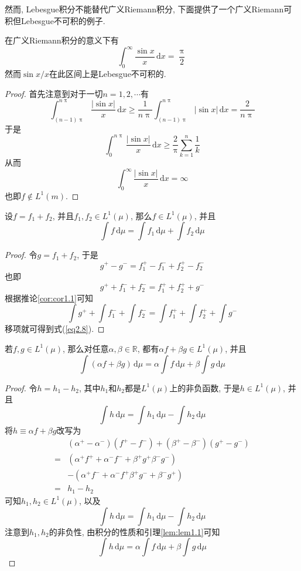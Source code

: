 \documentclass[cn, 12pt, math=mtpro2, bibstyle=apa, blue, twocol]{elegantbook}
\newcommand{\R}{\mathbb{R}}
\newcommand{\du}{\,\text{d}\mu}
\begin{document}
然而, Lebesgue积分不能替代广义Riemann积分, 下面提供了一个广义Riemann可积但Lebesgue不可积的例子.
\begin{example}
在广义Riemann积分的意义下有
$$\int_{0}^{\infty}\frac{\sin x}{x}\,\text{d}x=\frac{\uppi}{2}$$
然而$\sin x/x$在此区间上是Lebesgue不可积的.
\end{example}
\begin{proof}
  首先注意到对于一切$n=1,2,\cdots$有
  $$\int_{(n-1)\uppi}^{n\uppi}\frac{|\sin x|}{x}\,\text{d}x\geq \frac{1}{n\uppi}\int_{(n-1)\uppi}^{n\uppi}|\sin x|\,\text{d}x=\frac{2}{n\uppi}$$
  于是
  $$\int_{0}^{n\uppi}\frac{|\sin x|}{x}\,\text{d}x\geq\frac{2}{\uppi}\sum_{k=1}^{n}\frac{1}{k}$$
  从而
  $$\int_{0}^{\infty}\frac{|\sin x|}{x}\,\text{d}x=\infty$$
  也即$f\notin L^1(m)$.
\end{proof}


\begin{lemma}\label{lem:lem1.1}
设$f=f_1+f_2$, 并且$f_1, f_2\in L^1(\mu)$, 那么$f\in L^1(\mu)$, 并且
\begin{equation}\label{eq2.8}
  \int f\du=\int f_1\du+\int f_2\du
\end{equation}
\end{lemma}
\begin{proof}
  令$g=f_1+f_2$, 于是
  $$g^+-g^-=f_1^+-f_1^-+f_2^+-f_2^-$$
  也即
  $$g^++f_1^-+f_2^-=f_1^++f_2^++g^-$$
  根据推论\ref{cor:cor1.1}可知
  $$\int g^++\int f_1^-+\int f_2^-=\int f_1^++\int f_2^++\int g^-$$
  移项就可得到式(\ref{eq2.8}).
\end{proof}

\begin{theorem}
若$f, g\in L^1(\mu)$, 那么对任意$\alpha, \beta\in\R$, 都有$\alpha f+\beta g\in L^1(\mu)$, 并且
$$\int (\alpha f+\beta g)\du=\alpha\int f\du+\beta\int g\du$$
\end{theorem}
\begin{proof}
  令$h=h_1-h_2$, 其中$h_1$和$h_2$都是$L^1(\mu)$上的非负函数, 于是$h\in L^1(\mu)$, 并且
  \begin{equation}\label{eq1.13}
    \int h\du=\int h_1\du-\int h_2\du
  \end{equation}
  将$h\equiv \alpha f+\beta g$改写为
  \begin{align*}
  &(\alpha^+-\alpha^-)(f^+-f^-)+(\beta^+-\beta^-)(g^+-g^-) \\
  =&(\alpha^+f^++\alpha^-f^-+\beta^+g^+\beta^-g^-) \\
  & -(\alpha^+f^-+\alpha^-f^+\beta^+g^-+\beta^-g^+) \\
  =&h_1-h_2
  \end{align*}
  可知$h_1, h_2\in L^1(\mu)$, 以及
  $$\int h\du=\int h_1\du-\int h_2\du$$
  注意到$h_1, h_2$的非负性, 由积分的性质和引理\ref{lem:lem1.1}可知
  $$\int h\du=\alpha\int f\du+\beta\int g\du$$
\end{proof}
\end{document}
